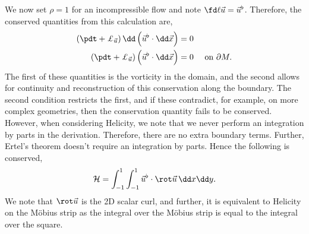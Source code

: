 We now set $\rho = 1$ for an incompressible flow and note $\fd \ell {\vec u} = \vec u^\flat$. Therefore, the conserved quantities from this calculation are,
\begin{align*}
  \left( \pdt + \pounds_{\vec u}\right)\dd \left(\vec u^\flat \cdot \dd\vec x\right) &= 0 \\
  \left( \pdt + \pounds_{\vec u}\right) \left( \vec u^\flat\cdot \dd \vec x \right) &= 0 & \text{ on } \partial M.
\end{align*}
The first of these quantities is the vorticity in the domain, and the second allows for continuity and reconstruction of this conservation along the boundary. The second condition restricts the first, and if these contradict, for example, on more complex geometries, then the conservation quantity fails to be conserved. However, when considering Helicity, we note that we never perform an integration by parts in the derivation. Therefore, there are no extra boundary terms. Further, Ertel's theorem doesn't require an integration by parts. Hence the following is conserved,
$$ \mathcal{H} = \int_{-1}^1 \int_{-1}^1 \vec u^\flat \cdot \rot \vec u\, \dd x\dd y. $$
We note that $\rot \vec u$ is the 2D scalar curl, and further, it is equivalent to Helicity on the M\"obius strip as the integral over the M\"obius strip is equal to the integral over the square.